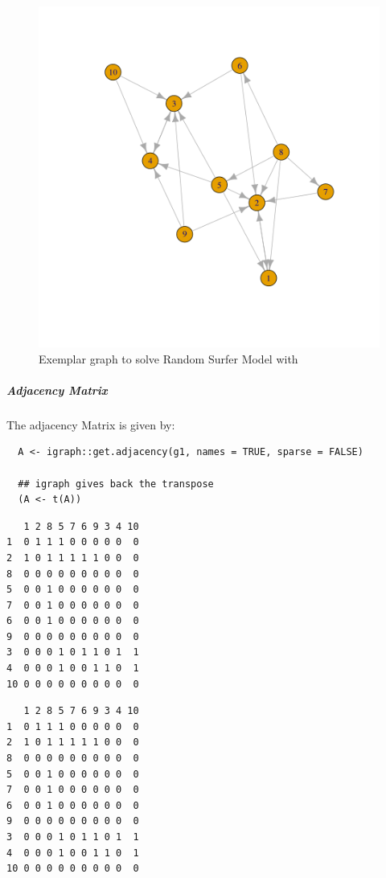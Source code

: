 \documentclass[11pt]{article}
\begin{document}
\begin{figure}[htbp]
\centering
\includegraphics[width=12cm]{media/example-graph-power-walk.png}
\caption{\label{example-rs-graph}Exemplar graph to solve Random Surfer Model with}
\end{figure}

\subparagraph{Adjacency Matrix}
\label{adjacency-matrix}
The adjacency Matrix is given by:

\begin{lstlisting}
  A <- igraph::get.adjacency(g1, names = TRUE, sparse = FALSE)

  ## igraph gives back the transpose
  (A <- t(A))
\end{lstlisting}

\begin{verbatim}
   1 2 8 5 7 6 9 3 4 10
1  0 1 1 1 0 0 0 0 0  0
2  1 0 1 1 1 1 1 0 0  0
8  0 0 0 0 0 0 0 0 0  0
5  0 0 1 0 0 0 0 0 0  0
7  0 0 1 0 0 0 0 0 0  0
6  0 0 1 0 0 0 0 0 0  0
9  0 0 0 0 0 0 0 0 0  0
3  0 0 0 1 0 1 1 0 1  1
4  0 0 0 1 0 0 1 1 0  1
10 0 0 0 0 0 0 0 0 0  0
\end{verbatim}

\begin{verbatim}
   1 2 8 5 7 6 9 3 4 10
1  0 1 1 1 0 0 0 0 0  0
2  1 0 1 1 1 1 1 0 0  0
8  0 0 0 0 0 0 0 0 0  0
5  0 0 1 0 0 0 0 0 0  0
7  0 0 1 0 0 0 0 0 0  0
6  0 0 1 0 0 0 0 0 0  0
9  0 0 0 0 0 0 0 0 0  0
3  0 0 0 1 0 1 1 0 1  1
4  0 0 0 1 0 0 1 1 0  1
10 0 0 0 0 0 0 0 0 0  0
\end{verbatim}
\end{document}
